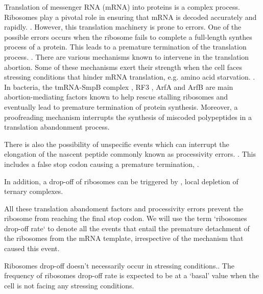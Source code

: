 \documentclass[a4,center,fleqn]{NAR}
\begin{document}
Translation of messenger RNA (mRNA) into proteins is a complex process. Ribosomes play a pivotal role in ensuring that mRNA is decoded accurately and rapidly.   \cite{keedy2018,ramakrishnan2002}. However, this translation machinery is prone to errors. One of the possible errors occurs when the ribosome fails to complete a full-length synthes process of a protein. This leads to a premature termination of the translation process. \cite{ou2019errors,chiarugi2016}.
There are various mechanisms known to intervene in the translation abortion. Some of these mechanisms exert their strength  when the cell faces stressing conditions that hinder mRNA translation, e.g. amino acid starvation. \cite{yip2021detecting}. 
In bacteria, the tmRNA-SmpB complex \cite{keiler1996role, keiler2015mechanisms}  , RF3  \cite{zaher2011primary} , ArfA \cite{chadani2010ribosome} and ArfB  \cite{chadani2011escherichia} are main abortion-mediating factors known to help rescue stalling ribosomes and eventually lead to premature termination of protein synthesis.
Moreover, a proofreading mechanism interrupts the synthesis of miscoded polypeptides in a translation abandonment process. \cite{zaher2009quality}

There is also the possibility of unspecific events which can interrupt  the elongation of the nascent peptide commonly known as processivity errors. \cite{gilchrist2006, kurland1993, kurland1992}. This includes 
a false stop codon causing a premature termination,  \cite{baranov2015augmented,gurvich2003sequences}. 

In addition, a drop-off of ribosomes can be triggered by , local depletion of ternary complexes. \cite{zhang2010global}

All these translation abandoment factors and processivity errors prevent the ribosome from reaching the final stop codon. 
We will use the term `ribosomes drop-off rate` to denote all the events that entail the premature detachment of the ribosomes from the mRNA template, irrespective of the mechanism  that caused this event. 


Ribosomes drop-off doesn't necessarily occur in stressing conditions.\cite{kurland1992,jorgensen1990processivity}. The frequency of ribosomes drop-off rate is expected  to be at a ‘basal’ value when the cell is not facing any stressing conditions. 



\enlargethispage{-65.1pt}
\end{document}
